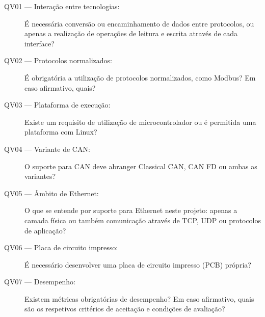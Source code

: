 \begin{description}
    \item[QV01 --- Interação entre tecnologias:]
    É necessária conversão ou encaminhamento de dados entre protocolos,
    ou apenas a realização de operações de leitura e escrita através
    de cada interface?

    \item[QV02 --- Protocolos normalizados:]
    É obrigatória a utilização de protocolos normalizados, como Modbus?
    Em caso afirmativo, quais?

    \item[QV03 --- Plataforma de execução:]
    Existe um requisito de utilização de microcontrolador ou é permitida
    uma plataforma com Linux?

    \item[QV04 --- Variante de CAN:]
    O suporte para CAN deve abranger Classical CAN, CAN FD ou ambas
    as variantes?

    \item[QV05 --- Âmbito de Ethernet:]
    O que se entende por suporte para Ethernet neste projeto:
    apenas a camada física ou também comunicação através de TCP,
    UDP ou protocolos de aplicação?

    \item[QV06 --- Placa de circuito impresso:]
    É necessário desenvolver uma placa de circuito impresso
    (PCB) própria?

    \item[QV07 --- Desempenho:]
    Existem métricas obrigatórias de desempenho? Em caso afirmativo,
    quais são os respetivos critérios de aceitação e condições
    de avaliação?
\end{description}
